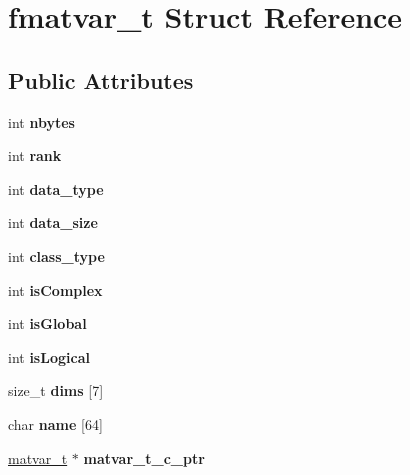 \hypertarget{structfmatvar__t}{}\section{fmatvar\+\_\+t Struct Reference}
\label{structfmatvar__t}
\subsection*{Public Attributes}
\begin{DoxyCompactItemize}
\item 
\mbox{\label{structfmatvar__t_a5d5898754329e5ec16b9bc1938da4510}} 
int {\bfseries nbytes}
\item 
\mbox{\label{structfmatvar__t_a8276d364e927be6ae8a0ff58978db315}} 
int {\bfseries rank}
\item 
\mbox{\label{structfmatvar__t_ac62e16d77af0b48cbe1104c860ead4e0}} 
int {\bfseries data\+\_\+type}
\item 
\mbox{\label{structfmatvar__t_a2a20d1e9e606b9323707698f8a1dad67}} 
int {\bfseries data\+\_\+size}
\item 
\mbox{\label{structfmatvar__t_ab3b9baefed77d41751542e88e9260c24}} 
int {\bfseries class\+\_\+type}
\item 
\mbox{\label{structfmatvar__t_a66281c15cd305040bffd7327a54d47ea}} 
int {\bfseries is\+Complex}
\item 
\mbox{\label{structfmatvar__t_adbcdd565cc91d1cfc841a68623b7b6db}} 
int {\bfseries is\+Global}
\item 
\mbox{\label{structfmatvar__t_ab23a315c57714923135e65ad6e93da39}} 
int {\bfseries is\+Logical}
\item 
\mbox{\label{structfmatvar__t_addf0e185582a0855401d37b77814796a}} 
size\+\_\+t {\bfseries dims} \mbox{[}7\mbox{]}
\item 
\mbox{\label{structfmatvar__t_a05571fde4ef701a844f95bb2340374b5}} 
char {\bfseries name} \mbox{[}64\mbox{]}
\item 
\mbox{\label{structfmatvar__t_ace4e85f05152670609b8df97db15f5e4}} 
\hyperlink{group___m_a_t_structmatvar__t}{matvar\+\_\+t} $\ast$ {\bfseries matvar\+\_\+t\+\_\+c\+\_\+ptr}
\end{DoxyCompactItemize}


